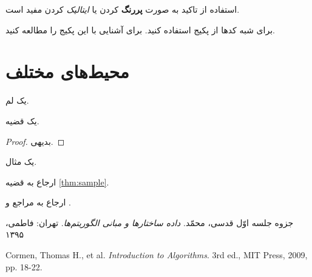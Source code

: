 \documentclass[11pt]{article}
\begin{document}
استفاده از تاکید به صورت 
\textbf{پررنگ}
کردن یا 
\textit{ایتالیک}
کردن مفید است. 

برای شبه کدها از پکیج
استفاده کنید. برای آشنایی با این پکیج
را مطالعه کنید.


\section{محیط‌های مختلف}
\begin{lemma}
	یک لم.
\end{lemma}
\begin{theorem}
	\label{thm:sample}
	یک قضیه. 
\end{theorem}
\begin{proof}
	بدیهی.
\end{proof}

\begin{example}
	یک مثال. 
\end{example}

ارجاع به قضیه 
\ref{thm:sample}.

ارجاع به مراجع
\cite{lecture1}
و
\cite{CLRS}.




\begin{thebibliography}{99}
	جزوه جلسه اوّل
	قدسی، محمّد. \textit{داده ساختارها و مبانی الگوریتم‌ها}. تهران: فاطمی، ۱۳۹۵
	
	\begin{latin}	%
		
		Cormen, Thomas H., et al.
		\textit{Introduction to Algorithms}. 
		3rd ed., MIT Press, 2009, pp. 18-22. %
	\end{latin}	
\end{thebibliography}
\end{document}

